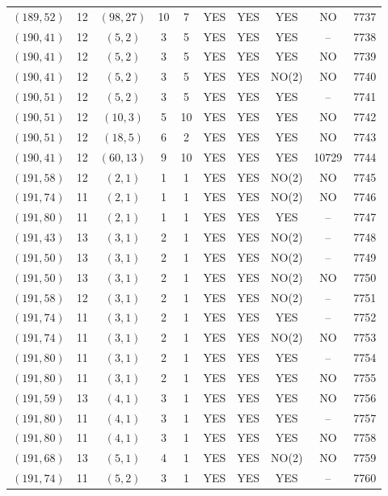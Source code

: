 \begin{longtable}{|c|c|c|c|c|c|c|c|c|c|}
$(189, 52)$ & 12 & $(98, 27)$ & 10 & 7 & YES & YES & YES & NO & 7737\\
$(190, 41)$ & 12 & $(5, 2)$ & 3 & 5 & YES & YES & YES & -- & 7738\\
$(190, 41)$ & 12 & $(5, 2)$ & 3 & 5 & YES & YES & YES & NO & 7739\\
$(190, 41)$ & 12 & $(5, 2)$ & 3 & 5 & YES & YES & NO(2) & NO & 7740\\
$(190, 51)$ & 12 & $(5, 2)$ & 3 & 5 & YES & YES & YES & -- & 7741\\
$(190, 51)$ & 12 & $(10, 3)$ & 5 & 10 & YES & YES & YES & NO & 7742\\
$(190, 51)$ & 12 & $(18, 5)$ & 6 & 2 & YES & YES & YES & NO & 7743\\
$(190, 41)$ & 12 & $(60, 13)$ & 9 & 10 & YES & YES & YES & 10729 & 7744\\
$(191, 58)$ & 12 & $(2, 1)$ & 1 & 1 & YES & YES & NO(2) & NO & 7745\\
$(191, 74)$ & 11 & $(2, 1)$ & 1 & 1 & YES & YES & NO(2) & NO & 7746\\
$(191, 80)$ & 11 & $(2, 1)$ & 1 & 1 & YES & YES & YES & -- & 7747\\
$(191, 43)$ & 13 & $(3, 1)$ & 2 & 1 & YES & YES & NO(2) & -- & 7748\\
$(191, 50)$ & 13 & $(3, 1)$ & 2 & 1 & YES & YES & NO(2) & -- & 7749\\
$(191, 50)$ & 13 & $(3, 1)$ & 2 & 1 & YES & YES & NO(2) & NO & 7750\\
$(191, 58)$ & 12 & $(3, 1)$ & 2 & 1 & YES & YES & NO(2) & -- & 7751\\
$(191, 74)$ & 11 & $(3, 1)$ & 2 & 1 & YES & YES & YES & -- & 7752\\
$(191, 74)$ & 11 & $(3, 1)$ & 2 & 1 & YES & YES & NO(2) & NO & 7753\\
$(191, 80)$ & 11 & $(3, 1)$ & 2 & 1 & YES & YES & YES & -- & 7754\\
$(191, 80)$ & 11 & $(3, 1)$ & 2 & 1 & YES & YES & YES & NO & 7755\\
$(191, 59)$ & 13 & $(4, 1)$ & 3 & 1 & YES & YES & YES & NO & 7756\\
$(191, 80)$ & 11 & $(4, 1)$ & 3 & 1 & YES & YES & YES & -- & 7757\\
$(191, 80)$ & 11 & $(4, 1)$ & 3 & 1 & YES & YES & YES & NO & 7758\\
$(191, 68)$ & 13 & $(5, 1)$ & 4 & 1 & YES & YES & NO(2) & NO & 7759\\
$(191, 74)$ & 11 & $(5, 2)$ & 3 & 1 & YES & YES & YES & -- & 7760\\

\end{longtable}
